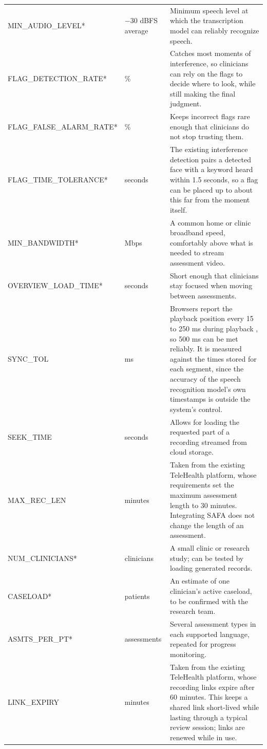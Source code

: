 \documentclass[12pt]{article}
\begin{document}
\begin{longtable}{>{\raggedright\arraybackslash}p{} >{\raggedright\arraybackslash}p{} p{}}
MIN\_\allowbreak{}AUDIO\_\allowbreak{}LEVEL* & $-$30 dBFS average & Minimum speech level at which the transcription model can reliably recognize speech.\\
FLAG\_\allowbreak{}DETECTION\_\allowbreak{}RATE* & 80\% & Catches most moments of interference, so clinicians can rely on the flags to decide where to look, while still making the final judgment.\\
FLAG\_\allowbreak{}FALSE\_\allowbreak{}ALARM\_\allowbreak{}RATE* & 20\% & Keeps incorrect flags rare enough that clinicians do not stop trusting them.\\
FLAG\_\allowbreak{}TIME\_\allowbreak{}TOLERANCE* & 2 seconds & The existing interference detection pairs a detected face with a keyword heard within 1.5 seconds, so a flag can be placed up to about this far from the moment itself.\\
MIN\_\allowbreak{}BANDWIDTH* & 25 Mbps & A common home or clinic broadband speed, comfortably above what is needed to stream assessment video.\\
OVERVIEW\_\allowbreak{}LOAD\_\allowbreak{}TIME* & 3 seconds & Short enough that clinicians stay focused when moving between assessments.\\
SYNC\_\allowbreak{}TOL & 500 ms & Browsers report the playback position every 15 to 250 ms during playback \citep{WHATWG_HTML_Media}, so 500 ms can be met reliably. It is measured against the times stored for each segment, since the accuracy of the speech recognition model’s own timestamps is outside the system’s control.\\
SEEK\_\allowbreak{}TIME & 2 seconds & Allows for loading the requested part of a recording streamed from cloud storage.\\
MAX\_\allowbreak{}REC\_\allowbreak{}LEN & 30 minutes & Taken from the existing TeleHealth platform, whose requirements set the maximum assessment length to 30 minutes. Integrating SAFA does not change the length of an assessment.\\
NUM\_\allowbreak{}CLINICIANS* & 10 clinicians & A small clinic or research study; can be tested by loading generated records.\\
CASELOAD* & 30 patients & An estimate of one clinician's active caseload, to be confirmed with the research team.\\
ASMTS\_\allowbreak{}PER\_\allowbreak{}PT* & 10 assessments & Several assessment types in each supported language, repeated for progress monitoring.\\
LINK\_\allowbreak{}EXPIRY & 60 minutes & Taken from the existing TeleHealth platform, whose recording links expire after 60 minutes. This keeps a shared link short-lived while lasting through a typical review session; links are renewed while in use.\\


\end{longtable}
\end{document}
